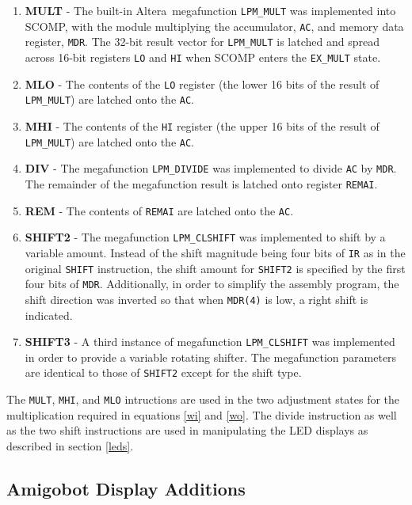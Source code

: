 \begin{enumerate}
\item \textbf{MULT} - The built-in
  Altera\textregistered~megafunction
  \verb+LPM_MULT+ was implemented into SCOMP, with the module
  multiplying the accumulator, \verb+AC+, and memory data register, \verb+MDR+. The 32-bit result vector
  for \verb+LPM_MULT+ is latched and spread across 16-bit registers
  \verb+LO+ and \verb+HI+ when SCOMP enters the \verb+EX_MULT+
  state. 
\item\textbf{MLO} - The contents of the \verb+LO+ register (the lower
  16 bits of the result of \verb+LPM_MULT+) are
  latched onto the \verb+AC+.
\item \textbf{MHI} - The contents of the \verb+HI+ register (the upper
  16 bits of the result of \verb+LPM_MULT+) are
  latched onto the \verb+AC+.
\item \textbf{DIV} - The megafunction \verb+LPM_DIVIDE+ was
  implemented to divide \verb+AC+ by \verb+MDR+. The remainder of the
  megafunction result is latched onto register \verb+REMAI+.
\item \textbf{REM} - The contents of \verb+REMAI+ are latched onto the
  \verb+AC+. 
\item \textbf{SHIFT2} - The megafunction \verb+LPM_CLSHIFT+ was
  implemented to shift by a variable amount. Instead of the shift
  magnitude being four bits of \verb+IR+ as in the original
  \verb+SHIFT+ instruction, the shift
  amount for \verb+SHIFT2+ is specified by the first four bits of
  \verb+MDR+. Additionally, in order to simplify the assembly program,
  the shift direction was inverted so that when \verb+MDR(4)+ is low,
  a right shift is indicated.
\item \textbf{SHIFT3} - A third instance of megafunction
  \verb+LPM_CLSHIFT+ was implemented in order to provide a variable
  rotating shifter. The megafunction parameters are identical to those
  of \verb+SHIFT2+ except for the shift type. 
\end{enumerate}

The \verb+MULT+, \verb+MHI+, and \verb+MLO+ intructions are used in
the two adjustment states for the multiplication required in equations
\ref{wi} and \ref{wo}. The divide instruction as well as the two shift instructions are used in
manipulating the LED displays as described in section \ref{leds}.

\subsection{Amigobot Display Additions}

